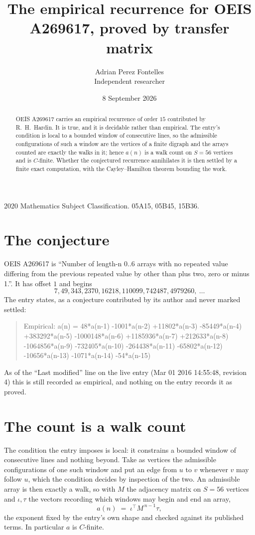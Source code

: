 \documentclass[11pt,a4paper]{article}
\title{The empirical recurrence for OEIS A269617, proved by transfer matrix}
\author{Adrian Perez Fontelles\\ \small Independent researcher}
\date{8 September 2026}
\theoremstyle{plain}
\theoremstyle{definition}
\begin{document}
\maketitle

\begin{abstract}
OEIS A269617 carries an empirical recurrence of order $15$ contributed by R.~H.~Hardin. It is
true, and it is decidable rather than empirical. The entry's condition is local to a bounded window of consecutive lines, so
the admissible configurations of such a window are the vertices of a finite digraph and the
arrays counted are exactly the walks in it; hence $a(n)$ is a walk count on $S=56$ vertices
and is $C$-finite. Whether the conjectured recurrence annihilates it is then settled by a
finite exact computation, with the Cayley--Hamilton theorem bounding the work.
\end{abstract}

\noindent\small 2020 Mathematics Subject Classification. 05A15, 05B45, 15B36.\normalsize

\section{The conjecture}

OEIS A269617 is ``Number of length-n 0..6 arrays with no repeated value differing from the previous repeated value by other than plus two, zero or minus 1.''. It has offset $1$ and begins
\[
7, 49, 343, 2370, 16218, 110099, 742487, 4979260,\ \dots
\]
The entry states, as a conjecture contributed by its author and never marked settled:
\begin{quote}
Empirical: a(n) = 48*a(n-1) -1001*a(n-2) +11802*a(n-3) -85449*a(n-4) +383292*a(n-5) -1000148*a(n-6) +1185936*a(n-7) +212633*a(n-8) -1064856*a(n-9) -732405*a(n-10) -264438*a(n-11) -65802*a(n-12) -10656*a(n-13) -1071*a(n-14) -54*a(n-15)
\end{quote}
As of the ``Last modified'' line on the live entry (Mar 01 2016 14:55:48, revision 4) this is still
recorded as empirical, and nothing on the entry records it as proved.

\section{The count is a walk count}

The condition the entry imposes is local: it constrains a bounded window of consecutive lines and nothing beyond. Take as
vertices the admissible configurations of one such window and put an edge from $u$ to $v$
whenever $v$ may follow $u$, which the condition decides by inspection of the two. An
admissible array is then exactly a walk, so with $M$ the adjacency matrix on $S=56$ vertices
and $\iota,\tau$ the vectors recording which windows may begin and end an array,
\[
a(n)\;=\;\iota^{\!\top}M^{\,n-1}\tau ,
\]
the exponent fixed by the entry's own shape and checked against its published terms. In
particular $a$ is $C$-finite.
\end{document}
